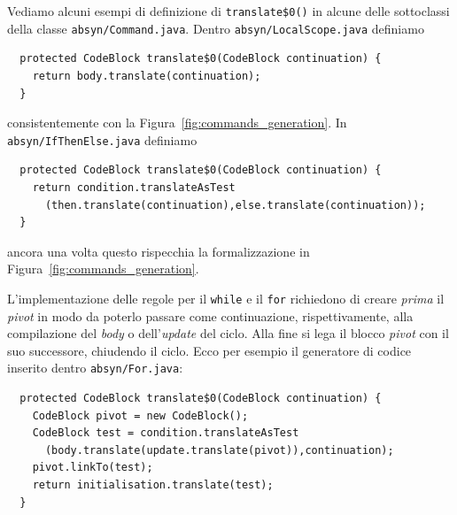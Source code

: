 Vediamo alcuni esempi di definizione di \texttt{translate\$0()} in alcune
delle sottoclassi della classe \texttt{absyn/Command.java}.
Dentro \texttt{absyn/LocalScope.java} definiamo
%
\begin{verbatim}
  protected CodeBlock translate$0(CodeBlock continuation) {
    return body.translate(continuation);
  }
\end{verbatim}
consistentemente con la Figura~\ref{fig:commands_generation}.
In \texttt{absyn/IfThenElse.java} definiamo
%
\begin{verbatim}
  protected CodeBlock translate$0(CodeBlock continuation) {
    return condition.translateAsTest
      (then.translate(continuation),else.translate(continuation));
  }
\end{verbatim}
ancora una volta questo rispecchia la formalizzazione in
Figura~\ref{fig:commands_generation}.

L'implementazione delle regole
per il \texttt{while} e il \texttt{for} richiedono di creare
\emph{prima} il \textit{pivot} in modo da poterlo passare come continuazione,
rispettivamente, alla compilazione del \textit{body} o
dell'\textit{update} del ciclo. Alla fine si lega il blocco \textit{pivot} con
il suo successore, chiudendo il ciclo. Ecco per esempio il generatore di codice
inserito dentro \texttt{absyn/For.java}:
%
\begin{verbatim}
  protected CodeBlock translate$0(CodeBlock continuation) {
    CodeBlock pivot = new CodeBlock();
    CodeBlock test = condition.translateAsTest
      (body.translate(update.translate(pivot)),continuation);
    pivot.linkTo(test);
    return initialisation.translate(test);
  }
\end{verbatim}

